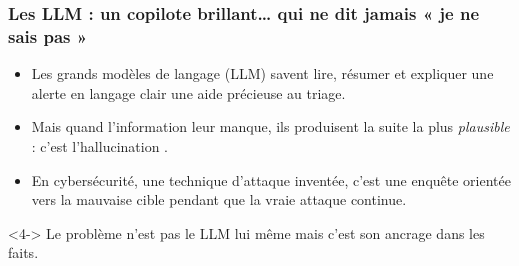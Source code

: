 \documentclass[aspectratio=169,11pt]{beamer}
\begin{document}
\begin{frame}
  \frametitle{Les LLM : un copilote brillant\ldots{} qui ne dit jamais « je ne sais pas »}
  \vspace{0.2cm}
  \begin{itemize}\setlength\itemsep{0.5em}
    \item Les grands modèles de langage (LLM) savent lire, résumer et
      expliquer une alerte en langage clair une aide précieuse au triage.
    \item<2-> Mais quand l'information leur manque, ils produisent la suite la
      plus \emph{plausible} : c'est l'hallucination .
    \item<3-> En cybersécurité, une technique d'attaque inventée, c'est une enquête orientée vers la mauvaise cible pendant que la vraie
      attaque continue.
  \end{itemize}
  \vspace{0.35cm}
  \begin{exampleblock}{ }<4->
    Le problème n'est pas le LLM lui même mais c'est son ancrage dans les faits.
  \end{exampleblock}
\end{frame}
\end{document}
